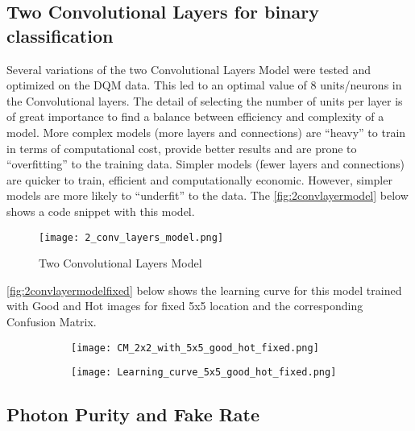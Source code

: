 \subsection{Two Convolutional Layers for binary classification}
Several variations of the two Convolutional Layers Model were tested and optimized on the DQM data. This led to an optimal value of 8 units/neurons in the Convolutional layers. 
The detail of selecting the number of units per layer is of great importance to find a balance between efficiency and complexity of a model. More complex models (more layers and connections) are “heavy” to train in terms of computational cost, provide better results and are prone to “overfitting” to the training data.
 Simpler models (fewer layers and connections) are quicker to train, efficient and computationally economic. However, simpler models are more likely to “underfit” to the data. The \autoref{fig:2convlayermodel} below shows a code snippet with this model.


\begin{figure}
\begin{center}
    \texttt{[image: 2\_conv\_layers\_model.png]}
\end{center}
\caption{Two Convolutional Layers Model\label{fig:2convlayermodel}}
\end{figure}


\autoref{fig:2convlayermodelfixed} below shows the learning curve for this model trained with Good and Hot images for fixed 5x5 location and the corresponding Confusion Matrix.

\begin{figure}
\centering
	\begin{subfigure}{.45\textwidth}
 	\texttt{[image: CM\_2x2\_with\_5x5\_good\_hot\_fixed.png]}
	\end{subfigure}
	\begin{subfigure}{.45\textwidth}
	\texttt{[image: Learning\_curve\_5x5\_good\_hot\_fixed.png]}
	\end{subfigure}
	\caption{\label{fig:2convlayermodelfixed}}
 \end{figure}
 
 
\subsection{Photon Purity and Fake Rate}\label{purity&fakerate}


